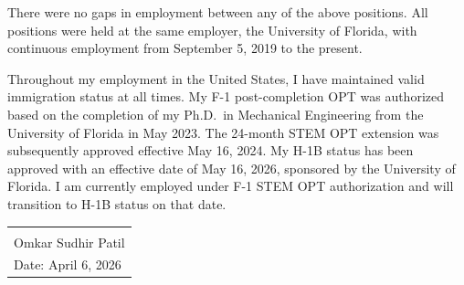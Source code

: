 \documentclass[11pt, letterpaper]{article}
\begin{document}
\vspace{0.3cm}

\vspace{0.5cm}

There were no gaps in employment between any of the above positions. All positions were held at the same employer, the University of Florida, with continuous employment from September 5, 2019 to the present.

\vspace{0.3cm}

Throughout my employment in the United States, I have maintained valid immigration status at all times. My F-1 post-completion OPT was authorized based on the completion of my Ph.D.\ in Mechanical Engineering from the University of Florida in May 2023. The 24-month STEM OPT extension was subsequently approved effective May 16, 2024. My H-1B status has been approved with an effective date of May 16, 2026, sponsored by the University of Florida. I am currently employed under F-1 STEM OPT authorization and will transition to H-1B status on that date.

\vspace{1.5cm}

\begin{tabular}{@{}p{7cm}@{}}
\hrulefill \\
Omkar Sudhir Patil \\
Date: April 6, 2026
\end{tabular}
\end{document}

